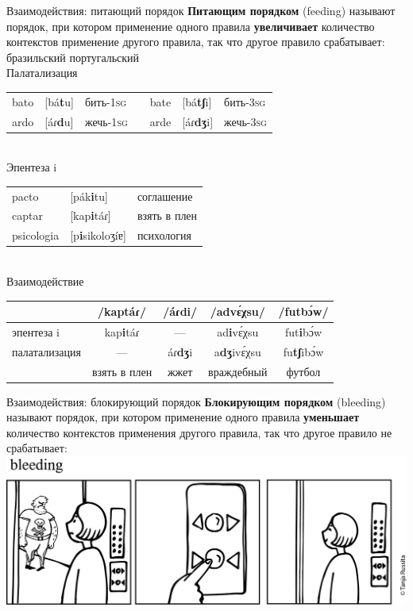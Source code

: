 \begin{frame}{Взаимодействия: питающий порядок}
\textbf{Питающим порядком} (feeding) называют порядок, при котором применение одного правила \textbf{увеличивает} количество контекстов применение другого правила, так что другое правило срабатывает:\medskip\\
\hfill бразильский португальский\\
Палатализация\\
\begin{tabular}{lllllll}
bato & [bá\textbf{t}u] & бить-1\textsc{sg} &  & bate & [bá\textbf{tʃ}i] & бить-3\textsc{sg} \\ 
ardo & [áɾ\textbf{d}u] & жечь-1\textsc{sg} &  & arde & [áɾ\textbf{dʒ}i] & жечь-3\textsc{sg} \\ 
\end{tabular}
\medskip\\
Эпентеза i\\
\begin{tabular}{lll}
pacto & [pák\textbf{i}tu] & соглашение \\ 
captar & [kap\textbf{i}táɾ] & взять в плен \\
psicologia & [p\textbf{i}sikoloʒíɐ] & психология\\
\end{tabular}
\medskip\\ Взаимодействие\\
\begin{tabular}{l|c|c|c|c}
 & /kaptáɾ/ & /áɾdi/ & /advɛ́χsu/ & /futbɔ́w/ \\ \hline
эпентеза i & kap\textbf{i}táɾ & — & ad\textbf{i}vɛ́χsu & fut\textbf{i}bɔ́w \\ \hline
палатализация & — &áɾ\textbf{dʒ}i & a\textbf{dʒ}ivɛ́χsu & fu\textbf{tʃ}ibɔ́w \\ \hline
 & взять в плен  & жжет  & враждебный & футбол \\ 
\end{tabular}
\end{frame}

\begin{frame}{Взаимодействия: блокирующий порядок}
\textbf{Блокирующим порядком} (bleeding) называют порядок, при котором применение одного правила \textbf{уменьшает} количество контекстов применения другого правила, так что другое правило не срабатывает:\\
\vfill
\includegraphics[width=\linewidth]{Russita-bleeding}
\end{frame}

